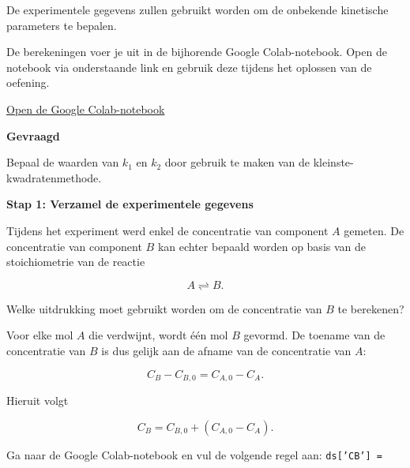 \documentclass{ximera}
\begin{document}
De experimentele gegevens zullen gebruikt worden om de onbekende kinetische parameters te bepalen.

De berekeningen voer je uit in de bijhorende Google Colab-notebook. Open de notebook via onderstaande link en gebruik deze tijdens het oplossen van de oefening.

\begin{center}
\href{https://colab.research.google.com/drive/1XiDw3d7TNHpXzvnJET9ZXZ9ro5OCJlXt?usp=sharing}{\Large Open de Google Colab-notebook}
\end{center}

\textbf{Gevraagd}

Bepaal de waarden van $k_1$ en $k_2$ door gebruik te maken van de kleinste-kwadratenmethode.

\begin{question}
\textbf{Stap 1: Verzamel de experimentele gegevens}

Tijdens het experiment werd enkel de concentratie van component $A$ gemeten. De concentratie van component $B$ kan echter bepaald worden op basis van de stoichiometrie van de reactie

\[
A \rightleftharpoons B.
\]

Welke uitdrukking moet gebruikt worden om de concentratie van $B$ te berekenen?

\begin{multipleChoice}
\end{multipleChoice}

\begin{feedback} \text{ }

Voor elke mol $A$ die verdwijnt, wordt één mol $B$ gevormd. De toename van de concentratie van $B$ is dus gelijk aan de afname van de concentratie van $A$:

\[
C_B-C_{B,0}=C_{A,0}-C_A.
\]

Hieruit volgt

\[
C_B=C_{B,0}+\left(C_{A,0}-C_A\right).
\]

\end{feedback}

Ga naar de Google Colab-notebook en vul de volgende regel aan: \texttt{ds['CB'] = }
\end{question}
\end{document}
